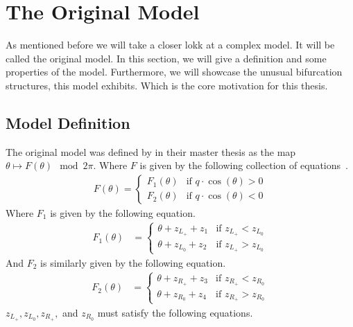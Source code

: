 \section{The Original Model}

As mentioned before we will take a closer lokk at a complex model.
It will be called the original model.
In this section, we will give a definition and some properties of the model.
Furthermore, we will showcase the unusual bifurcation structures, this model exhibits.
Which is the core motivation for this thesis.

\subsection{Model Definition}
\label{sec:og.def}

The original model was defined by  in their master thesis as the map $\theta \mapsto F(\theta) \mod 2 \pi$.
Where $F$ is given by the following collection of equations~\cite{akyuz2022}.
\begin{align}
	F(\theta) = \begin{cases}
		            F_1(\theta) & \text{if } q \cdot \cos(\theta) > 0 \\
		            F_2(\theta) & \text{if } q \cdot \cos(\theta) < 0
	            \end{cases}
\end{align}
Where $F_1$ is given by the following equation.
\begin{align}
	F_1(\theta) & = \begin{cases}
		                \theta + z_{L_+} + z_1 & \text{if } z_{L_+} < z_{L_0} \\
		                \theta + z_{L_0} + z_2 & \text{if } z_{L_+} > z_{L_0}
	                \end{cases}
\end{align}
And $F_2$ is similarly given by the following equation.
\begin{align}
	F_2(\theta) & = \begin{cases}
		                \theta + z_{R_+} + z_3 & \text{if } z_{R_+} < z_{R_0} \\
		                \theta + z_{R_0} + z_4 & \text{if } z_{R_+} > z_{R_0}
	                \end{cases}
\end{align}
$z_{L_+}, z_{L_0}, z_{R_+},$ and $z_{R_0}$ must satisfy the following equations.
